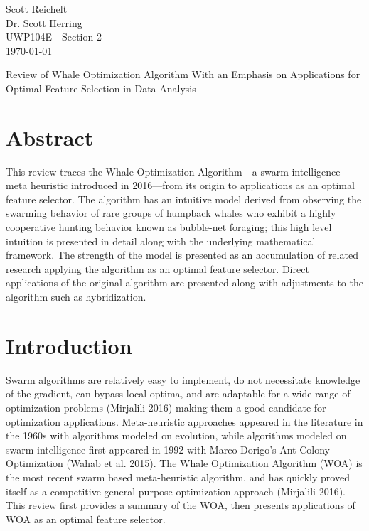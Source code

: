 \documentclass[11pt]{article}
\begin{document}
{ %
    \thispagestyle{empty}
    \begin{flushleft}
        Scott Reichelt\\
        Dr. Scott Herring\\
        UWP104E - Section 2\\
        \today\\
    \end{flushleft}
    \vspace{1em}
}
    \begin{center}
        Review of Whale Optimization Algorithm With an Emphasis on Applications for Optimal Feature Selection in Data Analysis
    \end{center}

\section*{Abstract}
    This review traces the Whale Optimization Algorithm---a swarm intelligence meta heuristic introduced in 2016---from its origin to applications as an optimal feature selector.
    The algorithm has an intuitive model derived from observing the swarming behavior of rare groups of humpback whales who exhibit a highly cooperative hunting behavior known as bubble-net foraging; this high level intuition is presented in detail along with the underlying mathematical framework.
    The strength of the model is presented as an accumulation of related research applying the algorithm as an optimal feature selector.
    Direct applications of the original algorithm are presented along with adjustments to the algorithm such as hybridization.

\section*{Introduction} {
    Swarm algorithms are relatively easy to implement, do not necessitate knowledge of the gradient, can bypass local optima, and are adaptable for a wide range of optimization problems (Mirjalili 2016) making them a good candidate for optimization applications.
    Meta-heuristic approaches appeared in the literature in the 1960s with algorithms modeled on evolution, while algorithms modeled on swarm intelligence first appeared in 1992 with Marco Dorigo's Ant Colony Optimization (Wahab et al. 2015).
    The Whale Optimization Algorithm (WOA) is the most recent swarm based meta-heuristic algorithm, and has quickly proved itself as a competitive general purpose optimization approach (Mirjalili 2016). 
    This review first provides a summary of the WOA, then presents applications of WOA as an optimal feature selector.
}
\end{document}
